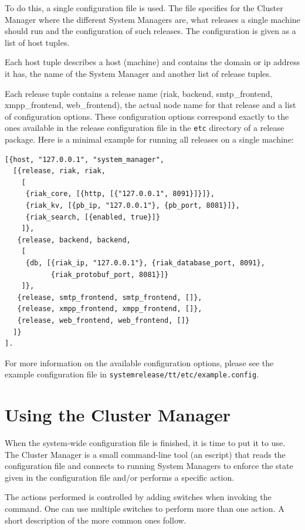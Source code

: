 \documentclass[11pt,a4paper]{report}
\begin{document}
To do this, a single configuration file is used. The file specifies for the
Cluster Manager where the different System Managers are, what releases a single
machine should run and the configuration of such releases. The configuration is
given as a list of host tuples.

Each host tuple describes a host (machine) and contains the domain or ip address
it has, the name of the System Manager and another list of release tuples.

Each release tuple contains a release name (riak, backend, smtp\_frontend,
xmpp\_frontend, web\_frontend), the actual node name for that release and a list
of configuration options. These configuration options correspond exactly to the
ones available in the release configuration file in the {\tt etc} directory of a
release package. Here is a minimal example for running all releases on a single
machine:

\begin{Verbatim}[samepage=true]
[{host, "127.0.0.1", "system_manager",
  [{release, riak, riak,
    [
     {riak_core, [{http, [{"127.0.0.1", 8091}]}]},
     {riak_kv, [{pb_ip, "127.0.0.1"}, {pb_port, 8081}]},
     {riak_search, [{enabled, true}]}
    ]},
   {release, backend, backend,
    [
     {db, [{riak_ip, "127.0.0.1"}, {riak_database_port, 8091},
           {riak_protobuf_port, 8081}]}
    ]},
   {release, smtp_frontend, smtp_frontend, []},
   {release, xmpp_frontend, xmpp_frontend, []},
   {release, web_frontend, web_frontend, []}
  ]}
].
\end{Verbatim}

\begin{sloppypar}
For more information on the available configuration options, please see the
example configuration file in {\tt system\-release/tt/etc/example.config}.
\end{sloppypar}
\section{Using the Cluster Manager}
When the system-wide configuration file is finished, it is time to put it to
use. The Cluster Manager is a small command-line tool (an escript) that reads
the configuration file and connects to running System Managers to enforce the
state given in the configuration file and/or performs a specific action.

The actions performed is controlled by adding switches when invoking the
command. One can use multiple switches to perform more than one action. A short
description of the more common ones follow.
\end{document}
